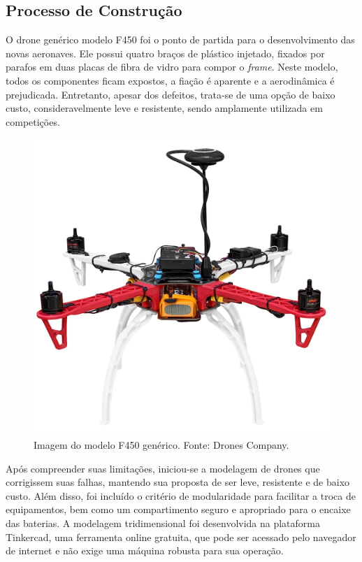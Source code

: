 \documentclass[conference]{IEEEtran}
\begin{document}
\subsection{Processo de Construção}

O drone genérico modelo F450 foi o ponto de partida para o desenvolvimento das novas aeronaves. Ele possui quatro braços de plástico injetado, fixados por parafos em duas placas de fibra de vidro para compor o \textit{frame}. Neste modelo, todos os componentes ficam expostos, a fiação é aparente e a aerodinâmica é prejudicada. Entretanto, apesar dos defeitos, trata-se de uma opção de baixo custo, consideravelmente leve e resistente, sendo amplamente utilizada em competições. 

\begin{figure}[!htb]
    \centering
    \includegraphics[scale=0.07]{img/f450.jpg} 
    \caption{Imagem do modelo F450 genérico. Fonte: Drones Company.}
    \label{fig:F450}
\end{figure}

Após compreender suas limitações, iniciou-se a modelagem de drones que corrigissem suas falhas, mantendo sua proposta de ser leve, resistente e de baixo custo. Além disso, foi incluído o critério de modularidade para facilitar a troca de equipamentos, bem como um compartimento seguro e apropriado para o encaixe das baterias. A modelagem tridimensional foi desenvolvida na plataforma Tinkercad, uma ferramenta online gratuita, que pode ser acessado pelo navegador de internet e não exige uma máquina robusta para sua operação.
\end{document}
